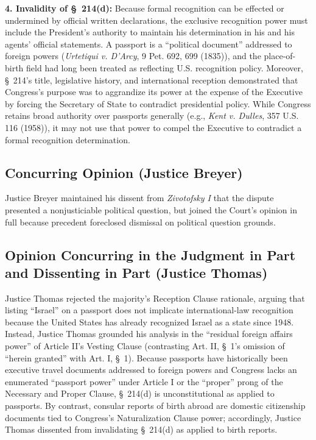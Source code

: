 \documentclass[12pt]{article}
\begin{document}
\textbf{4. Invalidity of \S~214(d):} Because formal recognition can be effected or undermined by official written declarations, the exclusive recognition power must include the President's authority to maintain his determination in his and his agents' official statements. A passport is a ``political document'' addressed to foreign powers (\textit{Urtetiqui v. D'Arcy}, 9 Pet. 692, 699 (1835)), and the place-of-birth field had long been treated as reflecting U.S. recognition policy. Moreover, \S~214's title, legislative history, and international reception demonstrated that Congress's purpose was to aggrandize its power at the expense of the Executive by forcing the Secretary of State to contradict presidential policy. While Congress retains broad authority over passports generally (e.g., \textit{Kent v. Dulles}, 357 U.S. 116 (1958)), it may not use that power to compel the Executive to contradict a formal recognition determination.

\subsection{Concurring Opinion (Justice Breyer)}

Justice Breyer maintained his dissent from \textit{Zivotofsky I} that the dispute presented a nonjusticiable political question, but joined the Court's opinion in full because precedent foreclosed dismissal on political question grounds.

\subsection{Opinion Concurring in the Judgment in Part and Dissenting in Part (Justice Thomas)}

Justice Thomas rejected the majority's Reception Clause rationale, arguing that listing ``Israel'' on a passport does not implicate international-law recognition because the United States has already recognized Israel as a state since 1948. Instead, Justice Thomas grounded his analysis in the ``residual foreign affairs power'' of Article II's Vesting Clause (contrasting Art. II, \S~1's omission of ``herein granted'' with Art. I, \S~1). Because passports have historically been executive travel documents addressed to foreign powers and Congress lacks an enumerated ``passport power'' under Article I or the ``proper'' prong of the Necessary and Proper Clause, \S~214(d) is unconstitutional as applied to passports. By contrast, consular reports of birth abroad are domestic citizenship documents tied to Congress's Naturalization Clause power; accordingly, Justice Thomas dissented from invalidating \S~214(d) as applied to birth reports.
\end{document}

